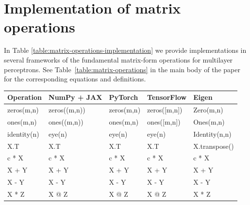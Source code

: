 \documentclass[twoside,11pt]{article}
\begin{document}
\section{Implementation of matrix operations} \label{appendix:matrix_operations}
In Table \ref{table:matrix-operations-implementation} we provide implementations in several frameworks of the fundamental matrix-form operations for multilayer perceptrons. See Table~\ref{table:matrix-operations} in the main body of the paper for the corresponding equations and definitions.

\begin{table}[h]
\scriptsize
\centering
\begin{tabular}{ p{2.2cm}|p{2.6cm}p{2.6cm}p{2.6cm}p{3.6cm} }
 \toprule
 Operation & NumPy + JAX & PyTorch & TensorFlow & Eigen\\
 \midrule
\textsf{zeros(m,n)}            & \textsf{zeros((m,n))}           & \textsf{zeros(m,n)}              & \textsf{zeros([m,n])}                & \textsf{Zero(m,n)}                      \\
\textsf{ones(m,n)}             & \textsf{ones((m,n))}            & \textsf{ones(m,n)}               & \textsf{ones([m,n])}                 & \textsf{Ones(m,n)}                      \\
\textsf{identity(n)}           & \textsf{eye(n)}                 & \textsf{eye(n)}                  & \textsf{eye(n)}                      & \textsf{Identity(n,n)}                  \\
\textsf{X.T}                   & \textsf{X.T}                    & \textsf{X.T}                     & \textsf{X.T}                         & \textsf{X.transpose()}                   \\
\textsf{c * X}                 & \textsf{c * X}                  & \textsf{c * X}                   & \textsf{c * X}                       & \textsf{c * X}                           \\
\textsf{X + Y}                 & \textsf{X + Y}                  & \textsf{X + Y}                   & \textsf{X + Y}                       & \textsf{X + Y}                           \\
\textsf{X - Y}                 & \textsf{X - Y}                  & \textsf{X - Y}                   & \textsf{X - Y}                       & \textsf{X - Y}                           \\
\textsf{X * Z}                 & \textsf{X @ Z}                  & \textsf{X @ Z}                   & \textsf{X @ Z}                       & \textsf{X * Z}                           \\

\end{tabular}
\end{table}
\end{document}
